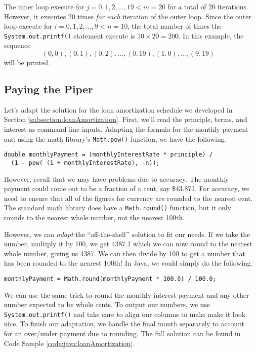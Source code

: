 The inner loop execute for $j = 0, 1, 2, \ldots, 19 < m = 20$ for a total
of 20 iterations.  However, it executes 20 times \emph{for each} iteration of
the outer loop.  Since the outer loop execute for $i = 0, 1, 2, \ldots, 9 < n = 10$, 
the total number of times the \texttt{System.out.printf()} statement execute is
$10 \times 20 = 200$.  In this example, the sequence 
 $$(0, 0), (0, 1), (0, 2), \ldots, (0,19), (1, 0), \ldots, (9, 19)$$
will be printed.

\subsection{Paying the Piper}

Let's adapt the solution for the loan amortization schedule we developed in 
Section \ref{subsection:loanAmortization}.  First, we'll read the principle, 
terms, and interest as command line inputs. Adapting the formula for the 
monthly payment and using the
math library's \texttt{Math.pow()} function, we have the
following.

\begin{verbatim}
double monthlyPayment = (monthlyInterestRate * principle) / 
  (1 - pow( (1 + monthlyInterestRate), -n));
\end{verbatim}

However, recall that we may have problems due to accuracy.  The monthly
payment could come out to be a fraction of a cent, say \$43.871.  For 
accuracy, we need to ensure that all of the figures for currency are rounded
to the nearest cent.  The standard math library does have a \texttt{Math.round()}
function, but it only rounds to the nearest whole number, not the nearest
100th.

However, we can \emph{adapt} the ``off-the-shelf'' solution to fit our needs.  
If we take the number, multiply it by 100, we get 4387.1 which we can
now round to the nearest whole number, giving us 4387.  We can then 
divide by 100 to get a number that has been rounded to the nearest 100th!
In Java, we could simply do the following.

\texttt{monthlyPayment = Math.round(monthlyPayment * 100.0) / 100.0;}

We can use the same trick to round the monthly interest payment and any
other number expected to be whole cents.  To output our numbers, we use
\texttt{System.out.printf()} and take care to align our columns 
to make make it look nice.  To finish our adaptation, we handle the final 
month separately to account for an over/under payment due to rounding.  
The full solution can be found in Code Sample \ref{code:java:loanAmortization}.

